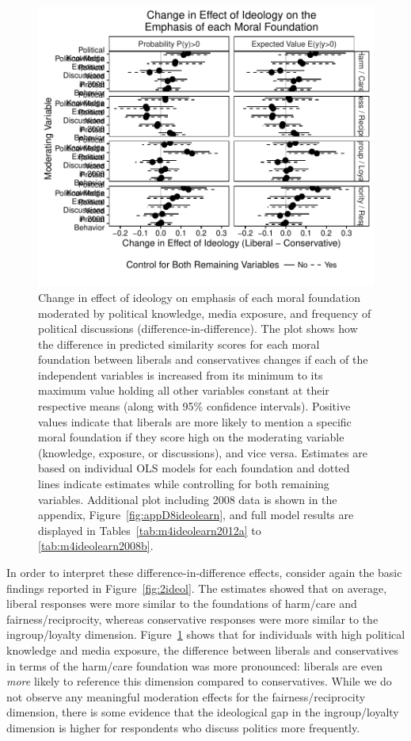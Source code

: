 \documentclass[12pt]{article}
\begin{document}
\begin{figure}[h]\centering
\includegraphics[scale=.9]{../calc/fig/fig4ideolearn.pdf}
\caption{Change in effect of ideology on emphasis of each moral foundation moderated by political knowledge, media exposure, and frequency of political discussions (difference-in-difference). The plot shows how the difference in predicted similarity scores for each moral foundation between liberals and conservatives changes if each of the independent variables is increased from its minimum to its maximum value holding all other variables constant at their respective means (along with 95\% confidence intervals). Positive values indicate that liberals are more likely to mention a specific moral foundation if they score high on the moderating variable (knowledge, exposure, or discussions), and vice versa. Estimates are based on individual OLS models for each foundation and dotted lines indicate estimates while controlling for both remaining variables. Additional plot including 2008 data is shown in the appendix, Figure~\ref{fig:appD8ideolearn}, and full model results are displayed in Tables~\ref{tab:m4ideolearn2012a} to \ref{tab:m4ideolearn2008b}.}\label{fig:4ideolearn}
\end{figure}

In order to interpret these difference-in-difference effects, consider again the basic findings reported in Figure~\ref{fig:2ideol}. The estimates showed that on average, liberal responses were more similar to the foundations of harm/care and fairness/reciprocity, whereas conservative responses were more similar to the ingroup/loyalty dimension. Figure~\ref{fig:4ideolearn} shows that for individuals with high political knowledge and media exposure, the difference between liberals and conservatives in terms of the harm/care foundation was more pronounced: liberals are even \textit{more} likely to reference this dimension compared to conservatives. While we do not observe any meaningful moderation effects for the fairness/reciprocity dimension, there is some evidence that the ideological gap in the ingroup/loyalty dimension is higher for respondents who discuss politics more frequently.
\end{document}

